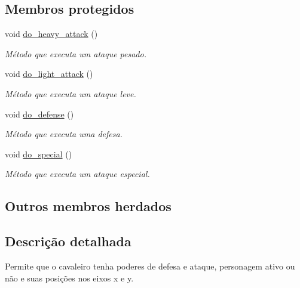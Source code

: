 \subsection*{Membros protegidos}
\begin{DoxyCompactItemize}
\item 
\mbox{\label{classKnight_a2bd72d822d94d0af391b66f4dce1af19}} 
void \mbox{\hyperlink{classKnight_a2bd72d822d94d0af391b66f4dce1af19}{do\+\_\+heavy\+\_\+attack}} ()
\begin{DoxyCompactList}\small\item\em Método que executa um ataque pesado. \end{DoxyCompactList}\item 
\mbox{\label{classKnight_abb516eb9c6d5544a9781ff726d0f1035}} 
void \mbox{\hyperlink{classKnight_abb516eb9c6d5544a9781ff726d0f1035}{do\+\_\+light\+\_\+attack}} ()
\begin{DoxyCompactList}\small\item\em Método que executa um ataque leve. \end{DoxyCompactList}\item 
\mbox{\label{classKnight_a2e9d92f7bd099ab26854cf247915fd0f}} 
void \mbox{\hyperlink{classKnight_a2e9d92f7bd099ab26854cf247915fd0f}{do\+\_\+defense}} ()
\begin{DoxyCompactList}\small\item\em Método que executa uma defesa. \end{DoxyCompactList}\item 
\mbox{\label{classKnight_a0e598393444b27ffe69d0438189279a9}} 
void \mbox{\hyperlink{classKnight_a0e598393444b27ffe69d0438189279a9}{do\+\_\+special}} ()
\begin{DoxyCompactList}\small\item\em Método que executa um ataque especial. \end{DoxyCompactList}\end{DoxyCompactItemize}
\subsection*{Outros membros herdados}


\subsection{Descrição detalhada}
Permite que o cavaleiro tenha poderes de defesa e ataque, personagem ativo ou não e suas posições nos eixos x e y. 


